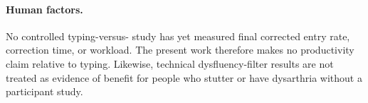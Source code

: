 \paragraph{Human factors.}
No controlled typing-versus-\YazSes{} study has yet measured final corrected entry rate,
correction time, or workload. The present work therefore makes no productivity claim relative to
typing. Likewise, technical dysfluency-filter results are not treated as evidence of benefit for
people who stutter or have dysarthria without a participant study.
